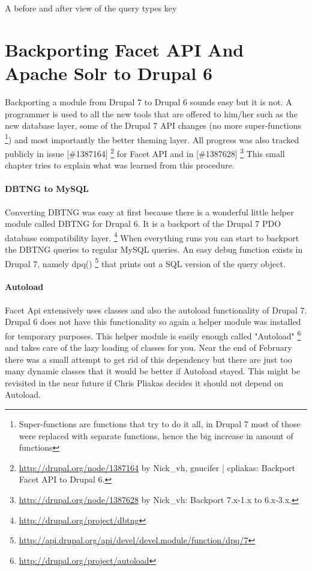 \vspace{25pt}
\caption{A before and after view of the query types key}
\clearpage

\section{Backporting Facet API And Apache Solr to Drupal 6}
Backporting a module from Drupal 7 to Drupal 6 sounds easy but it is not. A programmer is used to all the new tools that are offered to him/her such as the new database layer, some of the Drupal 7 API changes (no more super-functions \footnote{Super-functions are functions that try to do it all, in Drupal 7 most of those were replaced with separate functions, hence the big increase in amount of functions}) and most importantly the better theming layer. All progress was also tracked publicly in issue [\#1387164] \footnote{\url{http://drupal.org/node/1387164} by Nick\_vh, gnucifer | cpliakas: Backport Facet API to Drupal 6.} for Facet API and in [\#1387628] \footnote{\url{http://drupal.org/node/1387628} by Nick\_vh: Backport 7.x-1.x to 6.x-3.x.} This small chapter tries to explain what was learned from this procedure.

\paragraph{DBTNG to MySQL}
Converting DBTNG was easy at first because there is a wonderful little helper module called DBTNG for Drupal 6. It is a backport of the Drupal 7 PDO database compatibility layer. \footnote{\url{http://drupal.org/project/dbtng}} When everything runs you can start to backport the DBTNG queries to regular MySQL queries. An easy debug function exists in Drupal 7, namely dpq() \footnote{\url{http://api.drupal.org/api/devel/devel.module/function/dpq/7}} that prints out a SQL version of the query object.

\paragraph{Autoload}
Facet Api extensively uses classes and also the autoload functionality of Drupal 7. Drupal 6 does not have this functionality so again a helper module was installed for temporary purposes. This helper module is easily enough called "Autoload" \footnote{\url{http://drupal.org/project/autoload}} and takes care of the lazy loading of classes for you. Near the end of February there was a small attempt to get rid of this dependency but there are just too many dynamic classes that it would be better if Autoload stayed. This might be revisited in the near future if Chris Pliakas decides it should not depend on Autoload.

